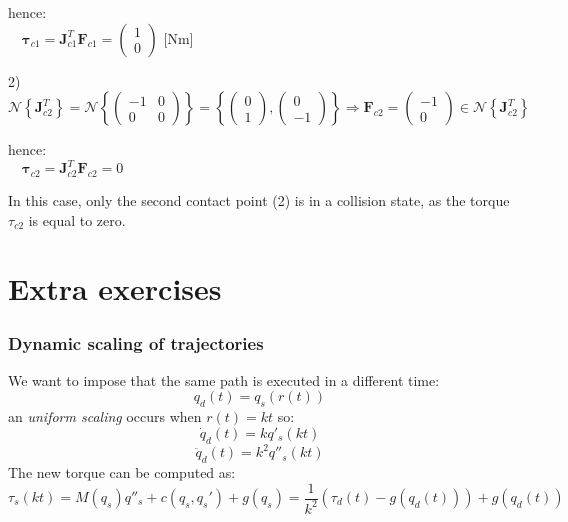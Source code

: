 \documentclass[a4paper,12pt]{article}
\begin{document}
\begin{center}
    hence:\\
    $\quad \boldsymbol{\tau}_{c1} = \boldsymbol{J}_{c1}^T \boldsymbol{F}_{c1} = \left(\begin{array}{c}
        1 \\
        0
        \end{array}\right) \text{ [Nm]}$
\end{center}

\begin{center}
    2) $\mathcal{N}\left\{\boldsymbol{J}_{c2}^T\right\} = \mathcal{N}\left\{\left(\begin{array}{cc}
        -1 & 0 \\
        0 & 0
        \end{array}\right)\right\} = \left\{\left(\begin{array}{cc} 0 \\ 1 \end{array}\right), \left(\begin{array}{cc} 0 \\ -1 \end{array}\right)\right\}
        \Rightarrow \boldsymbol{F}_{c2} = \left(\begin{array}{c}
        -1 \\
        0
        \end{array}\right) \in \mathcal{N}\left\{\boldsymbol{J}_{c2}^T\right\}$
    \end{center}
    
    \begin{center}
        hence:\\
        $\quad \boldsymbol{\tau}_{c2} = \boldsymbol{J}_{c2}^T \boldsymbol{F}_{c2} = 0$
    \end{center}

In this case, only the second contact point (2) is in a collision state, as the torque $\tau_{c2}$ is equal to zero.





\section{Extra exercises}
\subsubsection{Dynamic scaling of trajectories}
We want to impose that the same path is executed in a different time:
\begin{equation}
  q_d(t) = q_s(r(t))
\end{equation}
an \textit{uniform scaling} occurs when $r(t)=kt$ so:
\begin{equation}
    \dot{q}_d(t) = kq'_s(kt)
\end{equation}
\begin{equation}
    \ddot{q}_d(t) = k^2q''_s(kt)
\end{equation}
The new torque can be computed as:
\begin{equation}
    \tau_s(kt) = M(q_s)q''_s+c(q_s,q_s')+g(q_s) = \frac{1}{k^2}(\tau_d(t)-g(q_d(t)))+g(q_d(t))
\end{equation}
\end{document}
